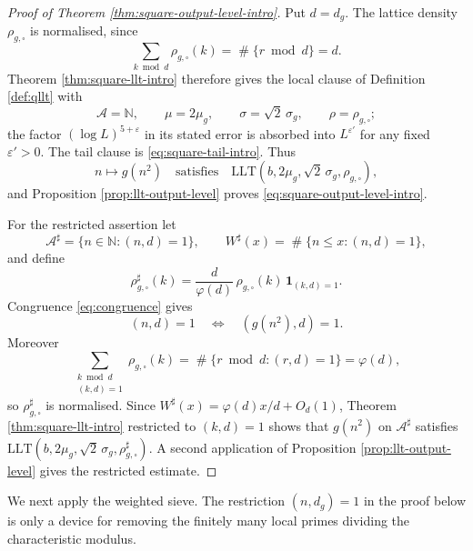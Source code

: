 \documentclass[11pt,reqno]{amsart}
\theoremstyle{plain}
\theoremstyle{definition}
\newcommand{\N}{\mathbb{N}}
\newcommand{\eps}{\varepsilon}
\newcommand{\1}{\mathbf 1}
\DeclareMathOperator{\Card}{\#}
\begin{document}
\begin{proof}[Proof of Theorem \ref{thm:square-output-level-intro}]
Put $d=d_g$.  The lattice density $\rho_{g,\square}$ is normalised, since
\[
 \sum_{k\bmod d}\rho_{g,\square}(k)
 =\Card\{r\bmod d\}=d.
\]
Theorem \ref{thm:square-llt-intro} therefore gives the local clause of Definition \ref{def:qllt} with
\[
 \mathcal A=\N,\qquad
 \mu=2\mu_g,\qquad
 \sigma=\sqrt2\,\sigma_g,\qquad
 \rho=\rho_{g,\square};
\]
the factor $(\log L)^{5+\eps}$ in its stated error is absorbed into $L^{\eps'}$ for any fixed $\eps'>0$.  The tail clause is \eqref{eq:square-tail-intro}.  Thus
\[
 n\longmapsto g(n^2)
 \quad\text{satisfies}\quad
 \mathrm{LLT}(b,2\mu_g,\sqrt2\,\sigma_g,\rho_{g,\square}),
\]
and Proposition \ref{prop:llt-output-level} proves \eqref{eq:square-output-level-intro}.

For the restricted assertion let
\[
 \mathcal A^\sharp=\{n\in\N:(n,d)=1\},\qquad
 W^\sharp(x)=\Card\{n\le x:(n,d)=1\},
\]
and define
\[
 \rho_{g,\square}^\sharp(k)
 =\frac d{\varphi(d)}\,\rho_{g,\square}(k)\,\1_{(k,d)=1}.
\]
Congruence \eqref{eq:congruence} gives
\[
 (n,d)=1\quad\Longleftrightarrow\quad(g(n^2),d)=1.
\]
Moreover
\[
 \sum_{\substack{k\bmod d\\(k,d)=1}}\rho_{g,\square}(k)
 =\Card\{r\bmod d:(r,d)=1\}=\varphi(d),
\]
so $\rho_{g,\square}^\sharp$ is normalised.  Since
$W^\sharp(x)=\varphi(d)x/d+O_d(1)$, Theorem \ref{thm:square-llt-intro} restricted to $(k,d)=1$ shows that $g(n^2)$ on $\mathcal A^\sharp$ satisfies
$\mathrm{LLT}(b,2\mu_g,\sqrt2\,\sigma_g,\rho_{g,\square}^\sharp)$.
A second application of Proposition \ref{prop:llt-output-level} gives the restricted estimate.
\end{proof}

We next apply the weighted sieve.  The restriction $(n,d_g)=1$ in the proof below is only a device for removing the finitely many local primes dividing the characteristic modulus.
\end{document}

